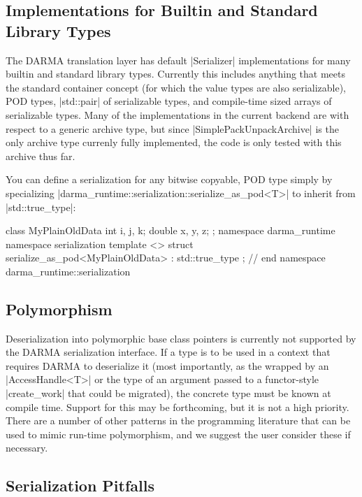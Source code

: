 \subsection{Implementations for Builtin and Standard Library Types}

The DARMA translation layer has default |Serializer| implementations for many
builtin and standard library types.  Currently this includes anything that meets
the standard container \gls{concept} (for which the value types are also
serializable), POD types, |std::pair| of serializable types, and
compile-time sized arrays of serializable types.  Many of the implementations in
the current backend are with respect to a generic archive type, but since
|SimplePackUnpackArchive| is the only archive type currenly fully implemented,
the code is only tested with this archive thus far.

You can define a serialization for any bitwise copyable, POD type simply by
specializing |darma_runtime::serialization::serialize_as_pod<T>| to inherit from
|std::true_type|:
\begin{CppCodeNumb}
class MyPlainOldData {
  int i, j, k;
  double x, y, z; 
};
namespace darma_runtime { namespace serialization {
template <>
struct serialize_as_pod<MyPlainOldData> : std::true_type { };
}} // end namespace darma_runtime::serialization
\end{CppCodeNumb}

\subsection{Polymorphism}

Deserialization into polymorphic base class pointers is currently not supported
by the DARMA serialization interface.  If a type is to be used in a context that
requires DARMA to deserialize it (most importantly, as the wrapped by an
|AccessHandle<T>| or the type of an argument passed to a
functor-style |create_work| that could be migrated), the concrete type must be
known at compile time.  Support for this may be forthcoming, but it is not a
high priority.  There are a number of other patterns in the programming
literature that can be used to mimic run-time polymorphism, and we suggest the
user consider these if necessary.

\subsection{Serialization Pitfalls}

